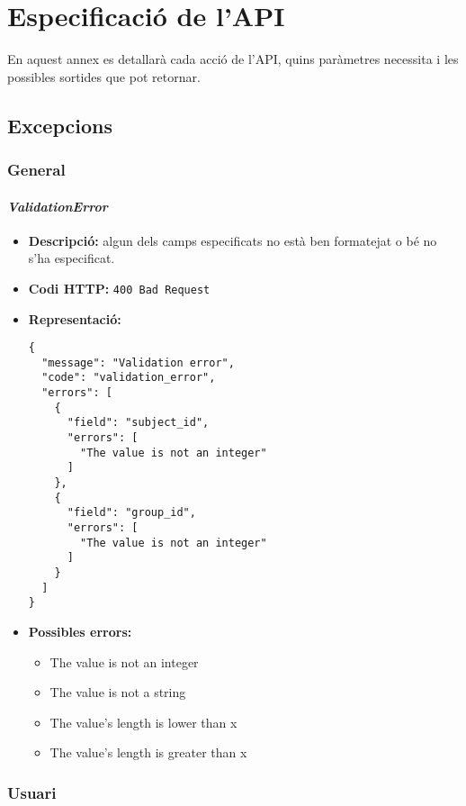 \chapter{Especificació de l'API}\label{manual}
En aquest annex es detallarà cada acció de l'\ac{API}, quins paràmetres necessita i les possibles sortides que pot retornar.

\section{Excepcions}

\subsection{General}
\subsubsection{\emph{ValidationError}}
\begin{itemize}
	\item \textbf{Descripció:} algun dels camps especificats no està ben formatejat o bé no s'ha especificat.
	\item \textbf{Codi \ac{HTTP}:} \texttt{400 Bad Request}
	\item \textbf{Representació:}
\begin{verbatim}
{
  "message": "Validation error",
  "code": "validation_error",
  "errors": [
    {
      "field": "subject_id",
      "errors": [
        "The value is not an integer"
      ]
    },
    {
      "field": "group_id",
      "errors": [
        "The value is not an integer"
      ]
    }
  ]
}
\end{verbatim}

\item \textbf{Possibles errors:}
	\begin{itemize}
		\item The value is not an integer
		\item The value is not a string
		\item The value's length is lower than x
		\item The value's length is greater than x
	\end{itemize}
\end{itemize}

\subsection{Usuari}

